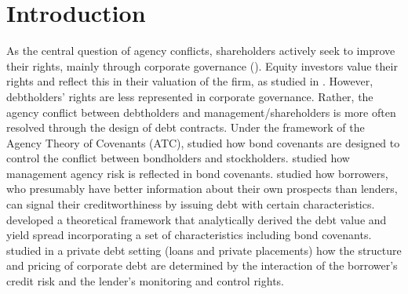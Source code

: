 \documentclass[a4paper, 10pt, authoryear]{elsarticle}
\begin{document}
\section{Introduction}
As the central question of agency conflicts, shareholders actively seek to improve their rights, mainly through corporate governance (\cite{gillanCorporateGovernanceProposals2000}). Equity investors value their rights and reflect this in their valuation of the firm, as studied in \cite{gompersCorporateGovernanceEquity2003}. However, debtholders' rights are less represented in corporate governance. Rather, the agency conflict between debtholders and management/shareholders is more often resolved through the design of debt contracts. Under the framework of the Agency Theory of Covenants (ATC), \cite{smithFinancialContracting1979} studied how bond covenants are designed to control the conflict between bondholders and stockholders. \cite{chavaManagerialAgencyBond2010} studied how management agency risk is reflected in bond covenants. \cite{diamondSeniorityMaturityDebt1993} studied how borrowers, who presumably have better information about their own prospects than lenders, can signal their creditworthiness by issuing debt with certain characteristics. \cite{lelandCorporateDebtValue1994a} developed a theoretical framework that analytically derived the debt value and yield spread incorporating a set of characteristics including bond covenants. \cite{bradleyStructurePricingCorporate2015} studied in a private debt setting (loans and private placements) how the structure and pricing of corporate debt are determined by the interaction of the borrower's credit risk and the lender's monitoring and control rights.
\newline
\end{document}
